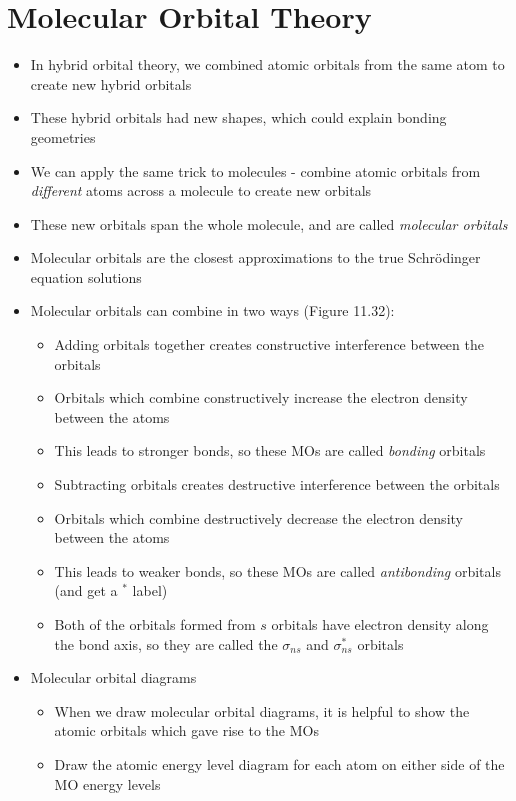 \documentclass[12pt, openany, letterpaper]{memoir}
\begin{document}
\section{Molecular Orbital Theory}
\begin{itemize}
	\item In hybrid orbital theory, we combined atomic orbitals from the same atom to create new hybrid orbitals
	\item These hybrid orbitals had new shapes, which could explain bonding geometries
	\item We can apply the same trick to molecules - combine atomic orbitals from \emph{different} atoms across a molecule to create new orbitals
	\item These new orbitals span the whole molecule, and are called \emph{molecular orbitals}
	\item Molecular orbitals are the closest approximations to the true Schr\"odinger equation solutions
	\item Molecular orbitals can combine in two ways (Figure 11.32):
	      \begin{itemize}
		      \item Adding orbitals together creates constructive interference between the orbitals
		      \item Orbitals which combine constructively increase the electron density between the atoms
		      \item This leads to stronger bonds, so these MOs are called \emph{bonding} orbitals
		      \item Subtracting orbitals creates destructive interference between the orbitals
		      \item Orbitals which combine destructively decrease the electron density between the atoms
		      \item This leads to weaker bonds, so these MOs are called \emph{antibonding} orbitals (and get a $^*$ label)
		      \item Both of the orbitals formed from $s$ orbitals have electron density along the bond axis, so they are called the $\sigma_{ns}$ and $\sigma_{ns}^*$ orbitals
	      \end{itemize}
	\item Molecular orbital diagrams
	      \begin{itemize}
		      \item When we draw molecular orbital diagrams, it is helpful to show the atomic orbitals which gave rise to the MOs
		      \item Draw the atomic energy level diagram for each atom on either side of the MO energy levels

\end{itemize}
\end{itemize}
\end{document}
